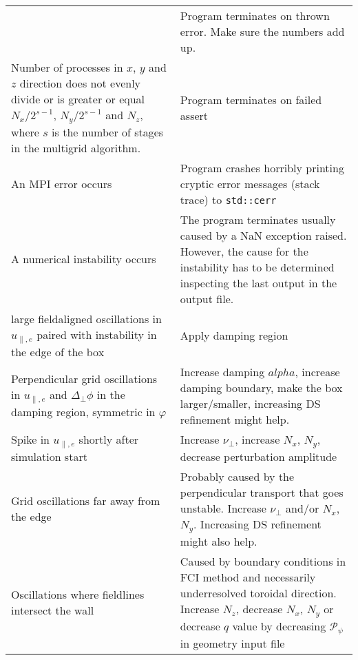 \begin{longtable}{p{6cm}p{8cm}}
&
Program terminates on thrown error. Make sure the numbers add up.
    \\
    Number of processes in $x$, $y$ and $z$ direction does not evenly divide or is greater or equal $N_x/2^{s-1}$, $N_y/2^{s-1}$ and $N_z$, where $s$ is the number of stages in the multigrid algorithm.
&
Program terminates on failed assert
    \\
An MPI error occurs
&
Program crashes horribly printing cryptic error messages (stack trace) to \texttt{std::cerr}
    \\
A numerical instability occurs
&
The program terminates usually caused by a NaN exception raised. However,
the cause for the instability has to be determined inspecting the
last output in the output file.
    \\
\qquad large fieldaligned oscillations in $u_{\parallel,e}$ paired with instability in the edge of the box
&
Apply damping region
    \\
\qquad Perpendicular grid oscillations in $u_{\parallel,e}$ and $\Delta_\perp \phi$ in the damping region, symmetric in $\varphi$
&
Increase damping $alpha$, increase damping boundary, make the box larger/smaller, increasing DS refinement might help.
    \\
\qquad Spike in $u_{\parallel,e}$ shortly after simulation start
&
Increase $\nu_\perp$, increase $N_x$, $N_y$, decrease perturbation amplitude
    \\
\qquad Grid oscillations far away from the edge
&
Probably caused by the perpendicular transport that goes unstable. Increase $\nu_\perp$ and/or $N_x$, $N_y$. Increasing DS refinement might also help.
\\
\qquad Oscillations where fieldlines intersect the wall
&
Caused by boundary conditions in FCI method and necessarily underresolved toroidal direction.
Increase $N_z$, decrease $N_x$, $N_y$ or decrease $q$ value by decreasing $\mathcal P_\psi$ in geometry input file
\\
\bottomrule
\end{longtable}





